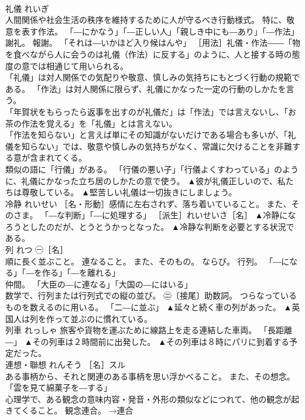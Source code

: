 \documentclass[8pt]{extreport}
\begin{document}
\begin{CJK}{UTF8}{min}
\\	礼儀	れいぎ	
\\	人間関係や社会生活の秩序を維持するために人が守るべき行動様式。 特に、敬意を表す作法。 「―にかなう」「―正しい人」「親しき中にも―あり」「―作法」 
\\	謝礼。 報謝。 「それは―いかほど入り候はんや」 ［用法］礼儀・作法――「物を食べながら人に会うのは礼儀（作法）に反する」のように、人と接する時の態度の意では相通じて用いられる。 
\\	「礼儀」は対人関係での気配りや敬意、慎しみの気持ちにもとづく行動の規範である。 「作法」は対人関係に限らず、礼儀にかなった一定の行動のしかたを言う。 
\\	「年賀状をもらったら返事を出すのが礼儀だ」は「作法」では言えないし、「お茶の作法を覚える」を「礼儀」とは言えない。 
\\	「作法を知らない」と言えば単にその知識がないだけである場合も多いが、「礼儀を知らない」では、敬意や慎しみの気持ちがなく、常識に欠けることを非難する意が含まれてくる。 
\\	類似の語に「行儀」がある。 「行儀の悪い子」「行儀よくすわっている」のように、礼儀にかなった立ち居のしかたの意で使う。	▲彼が礼儀正しいので、私たちは尊敬している。 ▲堅苦しい礼儀は一切抜きにしましょう。
\\	冷静	れいせい	［名・形動］感情に左右されず、落ち着いていること。 また、そのさま。 「―な判断」「―に処理する」 ［派生］れいせいさ［名］	▲冷静になろうとしたのだが、とうとうかっとなった。 ▲冷静な判断を必要とする状況である。
\\	列	れつ	㊀［名］ 
\\	順に長く並ぶこと。 連なること。 また、そのもの。 ならび。 行列。 「―になる」「―を作る」「―を離れる」 
\\	仲間。 「大臣の―に連なる」「大国の―にはいる」 
\\	数学で、行列または行列式での縦の並び。 ㊁〔接尾〕助数詞。 つらなっているものを数えるのに用いる。 「二―に並ぶ」	▲延々と続く車の列があった。 ▲英国人は列を作って並ぶのに慣れている。
\\	列車	れっしゃ	旅客や貨物を運ぶために線路上を走る連結した車両。 「長距離―」	▲その列車は２時間前に出発した。 ▲その列車は８時にパリに到着する予定だった。
\\	連想・聯想	れんそう	［名］スル 
\\	ある事柄から、それと関連のある事柄を思い浮かべること。 また、その想念。 「雲を見て綿菓子を―する」 
\\	心理学で、ある観念の意味内容・発音・外形の類似などにつれて、他の観念が起きてくること。 観念連合。 →連合 

\end{CJK}
\end{document}
